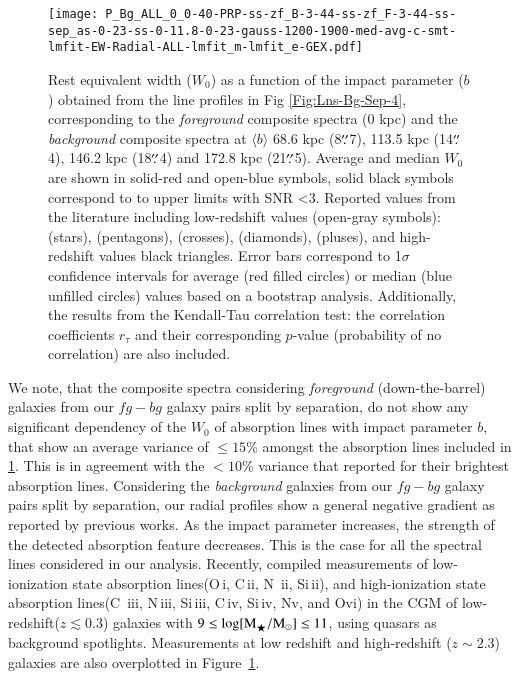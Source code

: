 \documentclass[longauth]{aa}
\begin{document}
   \begin{figure*}
   \centering
   \texttt{[image: P\_Bg\_ALL\_0\_0-40-PRP-ss-zf\_B-3-44-ss-zf\_F-3-44-ss-sep\_as-0-23-ss-0-11.8-0-23-gauss-1200-1900-med-avg-c-smt-lmfit-EW-Radial-ALL-lmfit\_m-lmfit\_e-GEX.pdf]}
   \caption{
   Rest equivalent width ($W_{0}$) as a function of the impact 
   parameter ($b$) obtained from the line profiles in Fig \ref{Fig:Lns-Bg-Sep-4},
   corresponding to the \textit{foreground} composite spectra (0 kpc) and the
   \textit{background} composite spectra at $\langle b \rangle$
   68.6 kpc (8$\overset{\prime\prime}{.}$7), 
   113.5 kpc (14$\overset{\prime\prime}{.}$4), 
   146.2 kpc (18$\overset{\prime\prime}{.}$4) and 
   172.8 kpc (21$\overset{\prime\prime}{.}$5). 
   Average and median $W_{0}$ are shown in solid-red and open-blue symbols,
   solid black symbols correspond to to upper limits with SNR
   <3. Reported values from the literature including low-redshift values
   (open-gray symbols):
   \citealt{Bordoloi18} (stars), 
   \citealt{Borthakur15} (pentagons), 
   \citealt{Liang14} (crosses), 
   \citealt{Prochaska11}  (diamonds), 
   \citealt{Werk13} (pluses), and  
   high-redshift values \citealt{Steidel10} black triangles. 
   Error bars correspond to 1$\sigma$ confidence intervals for average
   (red filled circles) or median (blue unfilled circles) values based on a
   bootstrap analysis. Additionally, the results from the Kendall-Tau
   correlation test: the correlation coefficients $r_{\tau}$ and their
   corresponding $p$-value (probability of no correlation) are also
   included.}
   \label{Fig:EW-Pfl-Bg-sep-4}%
   \end{figure*}   

We note, that the composite spectra considering \textit{foreground}
(down-the-barrel) galaxies from our $fg-bg$ galaxy pairs split by separation,
do not show any significant dependency of the $W_{0}$ of absorption lines
with impact parameter $b$, that show an average variance of $\leq15\%$
amongst the absorption lines included in \ref{Fig:EW-Pfl-Bg-sep-4}. This is
in agreement with the $< 10\%$ variance that \cite{Steidel10} reported for
their brightest absorption lines. Considering the \textit
{background} galaxies from our $fg-bg$ galaxy pairs split by separation, our
radial profiles show a general negative gradient as reported by previous
works. As the impact parameter increases, the strength of the detected
absorption feature decreases. This is the case for all the spectral lines
considered in our analysis. Recently, \cite{Kacprzak21} compiled measurements
of low-ionization state absorption lines(O\,{\sc i}, C\,{\sc ii}, N\,
{\sc ii}, Si\,{\sc ii}),  and high-ionization state absorption lines(C\,
{\sc iii}, N\,{\sc iii}, Si\,{\sc iii}, C\,{\sc iv}, Si\,{\sc iv}, N{\sc v},
and O{\sc vi}) in the CGM of low-redshift($z \lesssim 0.3$) galaxies with
$9\leq \rm{log[M}_{\bigstar}/\rm{M}_{\odot}]\leq11$, using quasars as
background spotlights. Measurements at low redshift
\citep{Bordoloi18,Borthakur15,Johnson17,Liang14,Prochaska11,Werk13} and
high-redshift ($z \sim 2.3$) galaxies \citep{Steidel10} are also overplotted
in Figure~\ref{Fig:EW-Pfl-Bg-sep-4}. 
\end{document}
